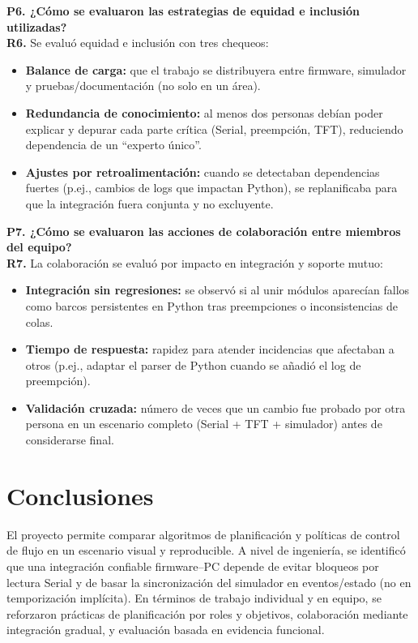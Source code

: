 \documentclass[journal]{IEEEtran}
\begin{document}
\textbf{P6. ¿Cómo se evaluaron las estrategias de equidad e inclusión utilizadas?}\\
\textbf{R6.} Se evaluó equidad e inclusión con tres chequeos:
\begin{itemize}
	\item \textbf{Balance de carga:} que el trabajo se distribuyera entre firmware, simulador y pruebas/documentación (no solo en un área).
	\item \textbf{Redundancia de conocimiento:} al menos dos personas debían poder explicar y depurar cada parte crítica (Serial, preempción, TFT), reduciendo dependencia de un ``experto único''.
	\item \textbf{Ajustes por retroalimentación:} cuando se detectaban dependencias fuertes (p.ej., cambios de logs que impactan Python), se replanificaba para que la integración fuera conjunta y no excluyente.
\end{itemize}

\textbf{P7. ¿Cómo se evaluaron las acciones de colaboración entre miembros del equipo?}\\
\textbf{R7.} La colaboración se evaluó por impacto en integración y soporte mutuo:
\begin{itemize}
	\item \textbf{Integración sin regresiones:} se observó si al unir módulos aparecían fallos como barcos persistentes en Python tras preempciones o inconsistencias de colas.
	\item \textbf{Tiempo de respuesta:} rapidez para atender incidencias que afectaban a otros (p.ej., adaptar el parser de Python cuando se añadió el log de preempción).
	\item \textbf{Validación cruzada:} número de veces que un cambio fue probado por otra persona en un escenario completo (Serial + TFT + simulador) antes de considerarse final.
\end{itemize}

\section{Conclusiones}
El proyecto permite comparar algoritmos de planificación y políticas de control de flujo en un escenario visual y reproducible. A nivel de ingeniería, se identificó que una integración confiable firmware--PC depende de evitar bloqueos por lectura Serial y de basar la sincronización del simulador en eventos/estado (no en temporización implícita). En términos de trabajo individual y en equipo, se reforzaron prácticas de planificación por roles y objetivos, colaboración mediante integración gradual, y evaluación basada en evidencia funcional.
\end{document}
